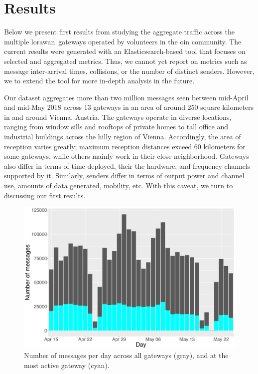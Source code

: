 \section{Results}\label{sec:results}

Below we present first results from studying the aggregate
traffic across the multiple \gls{lorawan} gateways operated
by volunteers in the \gls{oin} community.
The current results were generated with an Elasticsearch-based
tool that focuses on selected and aggregated metrics.
Thus, we
cannot yet report on metrics such as message inter-arrival times,
collisions, or the number of distinct senders. However, we
to extend the tool for more in-depth analysis in the future.

Our dataset aggregates more than two million messages seen between
mid-April and mid-May 2018 across 13 gateways in an area of around
250 square kilometers in and around Vienna, Austria.
The gateways operate in diverse locations, ranging from window sills
and rooftops of private homes to tall office and industrial buildings
across the hilly region of Vienna. Accordingly, the area of reception
varies greatly; maximum reception distances exceed 60 kilometers for
some gateways, while others mainly work in their close neighborhood.
Gateways also differ in terms of time deployed, their the hardware, and
frequency channels supported by it. Similarly, senders differ
in terms of output power and channel use, amounts of data generated,
mobility, etc.
With this caveat, we turn to discussing our first results.

\begin{figure}
  \centering
  \includegraphics[width=\columnwidth]{figures/counts.pdf}
  \caption{Number of messages per day across all gateways (gray), and at the most active gateway (cyan).}
  \label{fig:counts}
\end{figure}


